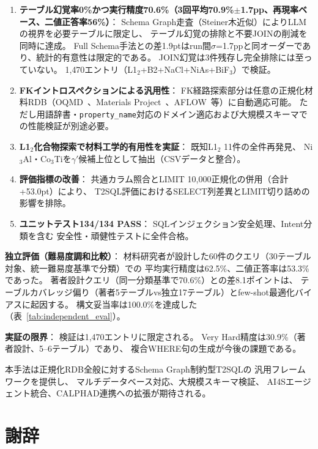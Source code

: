 \documentclass[5p,twocolumn]{elsarticle}
\begin{document}
\begin{enumerate}
  \item \textbf{テーブル幻覚率0\%かつ実行精度70.6\%（3回平均70.9\%$\pm$1.7pp、再現率ベース、二値正答率56\%）}：
    Schema Graph走査（Steiner木近似）によりLLMの視界を必要テーブルに限定し、
    テーブル幻覚の排除と不要JOINの削減を同時に達成。
    Full Schema手法との差1.9ptはrun間$\sigma$=1.7ppと同オーダーであり、統計的有意性は限定的である。
    JOIN幻覚は3件残存し完全排除には至っていない。
    1{,}470エントリ（L1$_2$+B2+NaCl+NiAs+BiF$_3$）で検証。
  \item \textbf{FKイントロスペクションによる汎用性}：
    FK経路探索部分は任意の正規化材料RDB（OQMD~\citep{saal2013oqmd}、Materials Project~\citep{jain2013mp}、AFLOW~\citep{curtarolo2012aflow}等）に自動適応可能。
    ただし用語辞書・\texttt{property\_name}対応のドメイン適応および大規模スキーマでの性能検証が別途必要。
  \item \textbf{L1$_2$化合物探索で材料工学的有用性を実証}：
    既知L1$_2$ 11件の全件再発見、
    Ni$_3$Al・Co$_3$Tiを$\gamma'$候補上位として抽出（CSVデータと整合）。
  \item \textbf{評価指標の改善}：
    共通カラム照合とLIMIT 10{,}000正規化の併用（合計+53.0pt）により、
    T2SQL評価におけるSELECT列差異とLIMIT切り詰めの影響を排除。
  \item \textbf{ユニットテスト134/134 PASS}：
    SQLインジェクション安全処理、Intent分類を含む
    安全性・頑健性テストに全件合格。
\end{enumerate}

\textbf{独立評価（難易度調和比較）}：
材料研究者が設計した60件のクエリ（30テーブル対象、統一難易度基準で分類）での
平均実行精度は62.5\%、二値正答率は53.3\%であった。
著者設計クエリ（同一分類基準で70.6\%）との差8.1ポイントは、
テーブルカバレッジ偏り（著者5テーブルvs独立17テーブル）とfew-shot最適化バイアスに起因する。
構文妥当率は100.0\%を達成した（表~\ref{tab:independent_eval}）。

\textbf{実証の限界}：
検証は1{,}470エントリに限定される。
Very Hard精度は30.9\%（著者設計、5--6テーブル）であり、
複合WHERE句の生成が今後の課題である。

本手法は正規化RDB全般に対するSchema Graph制約型T2SQLの
汎用フレームワークを提供し、
マルチデータベース対応、大規模スキーマ検証、
AI4Sエージェント統合、CALPHAD連携への拡張が期待される。

\section*{謝辞}
\end{document}
